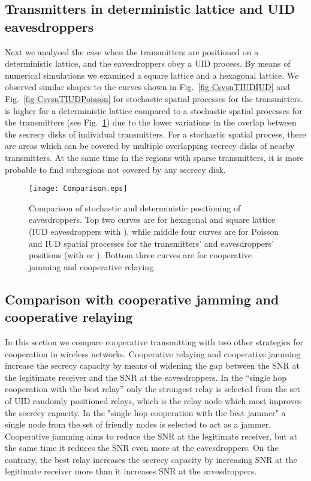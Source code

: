 \documentclass[conference,a4paper]{IEEEtran}
\begin{document}
\subsection{Transmitters in deterministic lattice and UID eavesdroppers}\label{sec-GridTxPoissonE}
Next we analysed the case when the transmitters are positioned on a deterministic lattice, and the eavesdroppers obey a UID process.
By means of numerical simulations we examined a square lattice and a hexagonal lattice.
We observed similar shapes to the curves shown in Fig.~\ref{fig-CsvsnTIUDIUD} and Fig.~\ref{fig-CsvsnTIUDPoisson} for stochastic spatial processes for the transmitters.
 is higher for a deterministic lattice compared to a stochastic spatial processes for the transmitters (see Fig.~\ref{fig-Comparison})
due to the lower variations in the overlap between the secrecy disks of individual transmitters.
For a stochastic spatial process, there are areas which can be covered by multiple overlapping secrecy disks of nearby transmitters.
At the same time in the regions with sparse transmitters, it is more probable to find subregions not covered by any secrecy disk.

\begin{figure}[htbp]
\centering
\texttt{[image: Comparison.eps]}
\caption{Comparison of stochastic and deterministic positioning of eavesdroppers. Top two curves are for hexagonal and square lattice (IUD eavesdroppers with ), while middle four curves are for Poisson and IUD spatial processes for the transmitters' and eavesdroppers'  positions (with  or ). Bottom three curves are for cooperative jamming and cooperative relaying.}
\label{fig-Comparison}
\end{figure}

\subsection{Comparison with cooperative jamming and cooperative relaying}\label{sec-comparison}
In this section we compare cooperative transmitting with two other strategies for cooperation in wireless networks.
Cooperative relaying and cooperative jamming increase the secrecy capacity by means of widening the gap between the SNR at the legitimate receiver and the SNR at the eavesdroppers.
In the “single hop cooperation with the best relay” \cite{MarinaStojanovskiPoor-ITA2012, MarinaStojanovskiPoor-2012} only the strongest relay is selected from the set of UID randomly positioned relays, which is the relay node which most improves the secrecy capacity. 
In the "single hop cooperation with the best jammer" \cite{MarinaStojanovskiPoor-ITA2012, MarinaStojanovskiPoor-2012} a single node from the set of friendly nodes is selected to act as a jammer.
Cooperative jamming aims to reduce the SNR at the legitimate receiver, but at the same time it reduces the SNR even more at the eavesdroppers.
On the contrary, the best relay increases the secrecy capacity by increasing SNR at the legitimate receiver more than it increases SNR at the eavesdroppers. 
\end{document}
